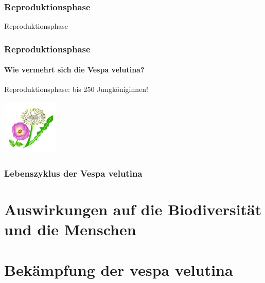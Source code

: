 \documentclass[aspectratio=169]{beamer}
\begin{document}
\subsubsection[Reproduktionsphase]{Reproduktionsphase}

\begin{frame}{Reproduktionsphase}
\frametitle{Reproduktionsphase} 
\framesubtitle{Wie vermehrt sich die Vespa velutina?}

\begin{examples}{Reproduktionsphase:  }{bis 250 Jungköniginnen!}
\begin{center}	
    \includegraphics[width=0.2\textwidth]{figures/BH-Logo_Quat.png}
\end{center}
\end{examples}
\end{frame}

\subsubsection{Lebenszyklus der Vespa velutina}
\section{Auswirkungen auf die Biodiversität und die Menschen}
\section{Bekämpfung der vespa velutina}
\end{document}
